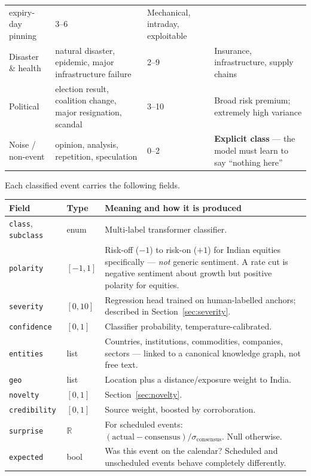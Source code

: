 \begin{longtable}{@{}p{3.3cm}p{4.4cm}p{2.1cm}p{4.4cm}@{}}
expiry-day pinning & 3--6 & Mechanical, intraday, exploitable\\
Disaster \& health & natural disaster, epidemic, major infrastructure failure &
2--9 & Insurance, infrastructure, supply chains\\
Political & election result, coalition change, major resignation, scandal &
3--10 & Broad risk premium; extremely high variance\\
Noise / non-event & opinion, analysis, repetition, speculation & 0--2 &
\textbf{Explicit class} --- the model must learn to say ``nothing here''\\
\bottomrule
\end{longtable}

Each classified event carries the following fields.

\begin{longtable}{@{}p{3.2cm}p{2.4cm}p{9.0cm}@{}}
\toprule
\textbf{Field} & \textbf{Type} & \textbf{Meaning and how it is produced}\\
\midrule
\texttt{class}, \texttt{subclass} & enum & Multi-label transformer classifier.\\
\texttt{polarity} & $[-1,1]$ & Risk-off ($-1$) to risk-on ($+1$) for Indian
equities specifically --- \emph{not} generic sentiment. A rate cut is negative
sentiment about growth but positive polarity for equities.\\
\texttt{severity} & $[0,10]$ & Regression head trained on human-labelled
anchors; described in Section~\ref{sec:severity}.\\
\texttt{confidence} & $[0,1]$ & Classifier probability, temperature-calibrated.\\
\texttt{entities} & list & Countries, institutions, commodities, companies,
sectors --- linked to a canonical knowledge graph, not free text.\\
\texttt{geo} & list & Location plus a distance/exposure weight to India.\\
\texttt{novelty} & $[0,1]$ & Section~\ref{sec:novelty}.\\
\texttt{credibility} & $[0,1]$ & Source weight, boosted by corroboration.\\
\texttt{surprise} & $\mathbb{R}$ & For scheduled events: $(\text{actual} -
\text{consensus})/\sigma_{\text{consensus}}$. Null otherwise.\\
\texttt{expected} & bool & Was this event on the calendar? Scheduled and
unscheduled events behave completely differently.\\
\bottomrule
\end{longtable}

